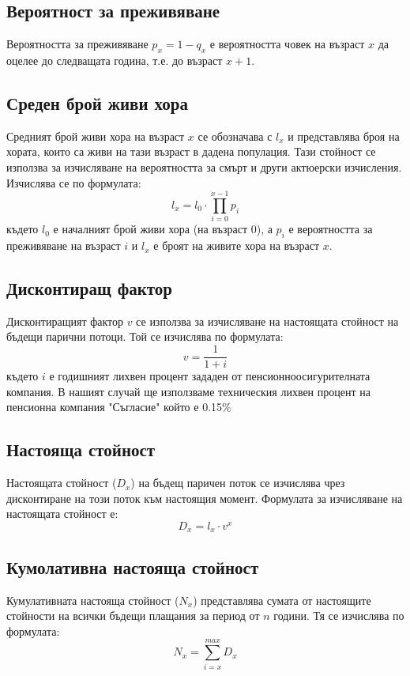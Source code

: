 \documentclass[a4paper,12pt]{article}
\begin{document}
\subsection{Вероятност за преживяване}
Вероятността за преживяване $p_x= 1-q_x$ е вероятността човек на възраст $x$ да оцелее до следващата година, т.е. до възраст $x+1$.
\subsection{Среден брой живи хора}
Средният брой живи хора на възраст $x$ се обозначава с $l_x$ и представлява броя на хората, които са живи на тази възраст в дадена популация. Тази стойност се използва за изчисляване на вероятността за смърт и други актюерски изчисления. Изчислява се по формулата:
\[l_{x} = l_0 \cdot \prod_{i=0}^{x-1} p_i\]
където $l_0$ е началният брой живи хора (на възраст 0), а $p_i$ е вероятността за преживяване на възраст $i$ и $l_x$ е броят на живите хора на възраст $x$.
\subsection{Дисконтиращ фактор}
Дисконтиращият фактор $v$ се използва за изчисляване на настоящата стойност на бъдещи парични потоци. Той се изчислява по формулата:
\[v = \frac{1}{1+i}\]
където $i$ е годишният лихвен процент зададен от пенсионноосигурителната компания. В нашият случай ще използваме техническия лихвен процент на пенсионна компания "Съгласие" който е 0.15\% \cite{DKFN_Pensions}
\subsection{Настояща стойност}
Настоящата стойност ($D_x$) на бъдещ паричен поток се изчислява чрез дисконтиране на този поток към настоящия момент. Формулата за изчисляване на настоящата стойност е:
\[D_x = l_x\cdot v^x\]
\subsection{Кумолативна настояща стойност}
Кумулативната настояща стойност ($N_x$) представлява сумата от настоящите стойности на всички бъдещи плащания за период от $n$ години. Тя се изчислява по формулата:
\[N_x = \sum_{i=x}^{max}D_x\]
\end{document}
